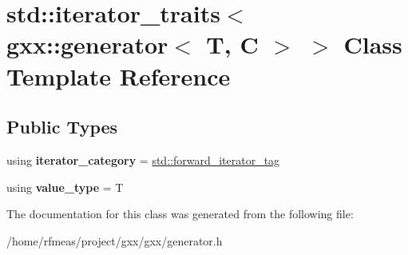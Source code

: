 \hypertarget{classstd_1_1iterator__traits_3_01gxx_1_1generator_3_01T_00_01C_01_4_01_4}{}\section{std\+:\+:iterator\+\_\+traits$<$ gxx\+:\+:generator$<$ T, C $>$ $>$ Class Template Reference}
\label{classstd_1_1iterator__traits_3_01gxx_1_1generator_3_01T_00_01C_01_4_01_4}
\subsection*{Public Types}
\begin{DoxyCompactItemize}
\item 
using {\bfseries iterator\+\_\+category} = \hyperlink{structstd_1_1forward__iterator__tag}{std\+::forward\+\_\+iterator\+\_\+tag}\hypertarget{classstd_1_1iterator__traits_3_01gxx_1_1generator_3_01T_00_01C_01_4_01_4_ae79abe88a883aed362da032a1a81cd72}{}\label{classstd_1_1iterator__traits_3_01gxx_1_1generator_3_01T_00_01C_01_4_01_4_ae79abe88a883aed362da032a1a81cd72}

\item 
using {\bfseries value\+\_\+type} = T\hypertarget{classstd_1_1iterator__traits_3_01gxx_1_1generator_3_01T_00_01C_01_4_01_4_af567bf4e95b497f7885180c39602649a}{}\label{classstd_1_1iterator__traits_3_01gxx_1_1generator_3_01T_00_01C_01_4_01_4_af567bf4e95b497f7885180c39602649a}

\end{DoxyCompactItemize}


The documentation for this class was generated from the following file\+:\begin{DoxyCompactItemize}
\item 
/home/rfmeas/project/gxx/gxx/generator.\+h\end{DoxyCompactItemize}
